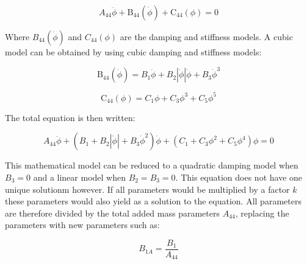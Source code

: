             
    
    \begin{equation}
A_{44} \ddot{\phi} + \operatorname{B_{44}}\left(\dot{\phi}\right) + \operatorname{C_{44}}\left(\phi\right) = 0
\label{eq:equation}
\end{equation}

    

    Where \(B_{44}(\dot{\phi})\) and \(C_{44}(\phi)\) are the damping and
stiffness models. A cubic model can be obtained by using cubic damping
and stiffness models:
 
            
    
    \begin{equation}
\operatorname{B_{44}}\left(\dot{\phi}\right) = B_{1} \dot{\phi} + B_{2} \left|{\dot{\phi}}\right| \dot{\phi} + B_{3} \dot{\phi}^{3}
\label{eq:equation}
\end{equation}

    
 
            
    
    \begin{equation}
\operatorname{C_{44}}\left(\phi\right) = C_{1} \phi + C_{3} \phi^{3} + C_{5} \phi^{5}
\label{eq:equation}
\end{equation}

    

    The total equation is then written:
 
            
    
    \begin{equation}
A_{44} \ddot{\phi} + \left(B_{1} + B_{2} \left|{\dot{\phi}}\right| + B_{3} \dot{\phi}^{2}\right) \dot{\phi} + \left(C_{1} + C_{3} \phi^{2} + C_{5} \phi^{4}\right) \phi = 0
\label{eq:equation}
\end{equation}

    

    This mathematical model can be reduced to a quadratic damping model when
\(B_3=0\) and a linear model when \(B_2=B_3=0\). This equation does not
have one unique solutionm however. If all parameters would be multiplied
by a factor \(k\) these parameters would also yield as a solution to the
equation. All parameters are therefore divided by the total added mass
parameters \(A_{44}\), replacing the parameters with new parameters such
as:
 
            
    
    \begin{equation}
B_{1A} = \frac{B_{1}}{A_{44}}
\label{eq:equation}
\end{equation}

